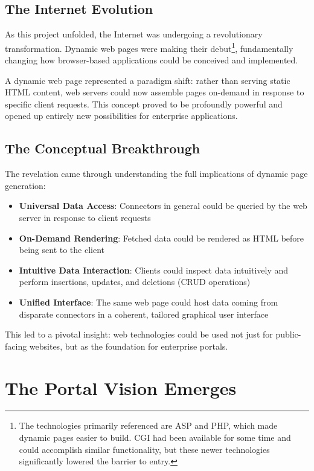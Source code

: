 \subsection{The Internet Evolution}

As this project unfolded, the Internet was undergoing a revolutionary transformation. Dynamic web pages were making their debut\footnote{The technologies primarily referenced are ASP and PHP, which made dynamic pages easier to build. CGI had been available for some time and could accomplish similar functionality, but these newer technologies significantly lowered the barrier to entry.}, fundamentally changing how browser-based applications could be conceived and implemented.

A dynamic web page represented a paradigm shift: rather than serving static HTML content, web servers could now assemble pages on-demand in response to specific client requests. This concept proved to be profoundly powerful and opened up entirely new possibilities for enterprise applications.

\subsection{The Conceptual Breakthrough}

The revelation came through understanding the full implications of dynamic page generation:

\begin{itemize}
\item \textbf{Universal Data Access}: Connectors in general could be queried by the web server in response to client requests
\item \textbf{On-Demand Rendering}: Fetched data could be rendered as HTML before being sent to the client
\item \textbf{Intuitive Data Interaction}: Clients could inspect data intuitively and perform insertions, updates, and deletions (CRUD operations)
\item \textbf{Unified Interface}: The same web page could host data coming from disparate connectors in a coherent, tailored graphical user interface
\end{itemize}

This led to a pivotal insight: web technologies could be used not just for public-facing websites, but as the foundation for enterprise portals.

\section{The Portal Vision Emerges}

